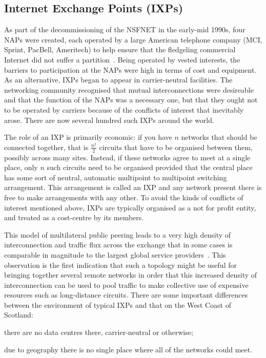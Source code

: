 \subsection{Internet Exchange Points (IXPs)}

As part of the decommissioning of the \ac{NSFNET}
in the early-mid 1990s, four \acp{NAP} were created, each operated by
a large American telephone company (MCI, Sprint, PacBell, Ameritech)
to help ensure that the fledgeling commercial Internet did not suffer
a
partition~\cite{hayes1997computing,Ager:2012:ALE:2342356.2342393}. Being
operated by vested interests, the barriers to participation at
the \acp{NAP} were high in terms of cost and equipment. As an
alternative, \acp{IXP} began to appear in carrier-neutral
facilities. The networking community recognised that mutual
interconnections were desireable and that the function of
the \acp{NAP} was a necessary one, but that they ought not to be
operated by carriers because of the conflicts of interest that
inevitably arose. There are now several hundred such \acp{IXP} around
the world.

The role of an \ac{IXP} is primarily economic: if
you have $n$ networks that should be connected together, that is
$\frac{n^2}{2}$ circuits that have to be organised between them,
possibly across many sites. Instead, if these networks agree to meet
at a single place, only $n$ such circuits need to be organised
provided that the central place has some sort of neutral, automatic
multipoint to multipoint switching arrangement. This arrangement is
called an \ac{IXP} and any network present there is free to make
arrangements with any other. To avoid the kinds of conflicts of
interest mentioned above, \acp{IXP} are typically organised as a not
for profit entity, and treated as a cost-centre by its members.

This model of multilateral public peering leads to a very high
density of interconnection and traffic flux across the exchange that
in some cases is comparable in magnitude to the largest global
service providers~\cite{Ager:2012:ALE:2342356.2342393}. This
observation is the first indication that such a topology might be
useful for bringing together several remote networks in order that
this increased density of interconnection can be used to pool traffic
to make collective use of expensive resources such as long-distance
circuits. There are some important differences between the environment
of typical \acp{IXP} and that on the West Coast of Scotland:
\begin{inparaenum}[(i)]
  \item there are no data centres there, carrier-neutral or otherwise;
  \item due to geography there is no single place where all of the
    networks could meet.
\end{inparaenum}



